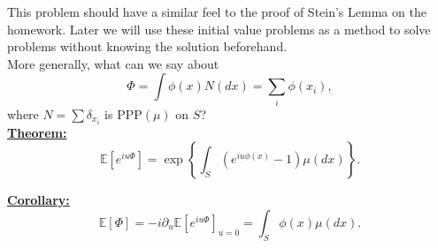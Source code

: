 \documentclass[12pt]{article}
\newcommand{\PPP}{\text{PPP}}
\theoremstyle{plain}
\begin{document}
This problem should have a similar feel to the proof of Stein's Lemma on the homework. Later we will use these initial value problems as a method to solve problems without knowing the solution beforehand.\\

More generally, what can we say about
\[
\Phi = \int \phi(x) N(dx) = \sum_i \phi(x_i),
\]
where $N = \sum \delta_{x_i}$ is $\PPP(\mu)$ on $S$?\\

\underline{\textbf{Theorem:}}
\[
\mathbb{E}\left[ e^{iu\Phi}\right] = \exp\left\{ \int_S \left(e^{iu\phi(x)} - 1\right) \mu(dx)\right\}.
\]

\underline{\textbf{Corollary:}}
\[
\mathbb{E}[\Phi] = -i \partial_u \mathbb{E}\left[ e^{iu \Phi}\right]_{u = 0} = \int_S \phi(x)\mu(dx).
\]
\end{document}
